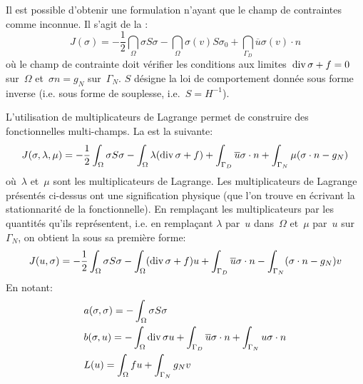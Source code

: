 \medskip
Il est possible d'obtenir une formulation n'ayant que le champ de contraintes comme inconnue. Il s'agit de la :
\begin{equation}
J(\sigma) =
-\frac12 \dint_\Omega \sigma S \sigma
-\dint_\Omega \sigma(v) S\sigma_0
+ \dint_{\Gamma_D} \overline{u} \sigma(v)\cdot n
\end{equation}
où le champ de contrainte doit vérifier les conditions aux limites~$\operatorname{div} \sigma + f =0$ sur~$\Omega$ et~$\sigma n = g_N$ sur~$\Gamma_N$. $S$ désigne la loi de comportement donnée sous forme inverse (i.e. sous forme de souplesse, i.e.~$S=H^{-1}$).

\medskip
L'utilisation de multiplicateurs de Lagrange permet de construire des fonctionnelles multi-champs. La  est la suivante:
\begin{equation}
J(\sigma,\lambda,\mu) =
-\frac12\displaystyle\int_\Omega \sigma S \sigma
-\displaystyle\int_\Omega \lambda (\operatorname{div} \sigma + f)
+ \displaystyle\int_{\Gamma_D} \overline{u}\sigma\cdot n
+ \displaystyle\int_{\Gamma_N} \mu (\sigma\cdot n -g_N)
\end{equation}
où~$\lambda$ et~$\mu$ sont les multiplicateurs de Lagrange.
\medskipvm
Les multiplicateurs de Lagrange présentés ci-dessus ont une signification physique (que l'on trouve en écrivant la stationnarité de la fonctionnelle). En remplaçant les multiplicateurs par les quantités qu'ils représentent, i.e. en remplaçant $\lambda$ par~$u$ dans~$\Omega$ et~$\mu$ par~$u$ sur~$\Gamma_N$, on obtient la  sous sa première forme:
\begin{equation}
J(u,\sigma) =
-\frac12 \displaystyle\int_\Omega \sigma S \sigma
-\displaystyle\int_\Omega (\operatorname{div} \sigma+f) u
+ \displaystyle\int_{\Gamma_D} \overline{u}\sigma\cdot n
- \displaystyle\int_{\Gamma_N} (\sigma\cdot n-g_N) v
\end{equation}
En notant:
\begin{align} 
&a(\sigma,\sigma)=-\displaystyle\int_\Omega \sigma S\sigma\\
&b(\sigma,u)=-\displaystyle\int_\Omega \operatorname{div}\sigma u + \displaystyle\int_{\Gamma_D} \overline{u}\sigma\cdot n + \displaystyle\int_{\Gamma_N} u\sigma\cdot n\\
&L(u)=\displaystyle\int_\Omega fu + \displaystyle\int_{\Gamma_N} g_N v\end{align}
